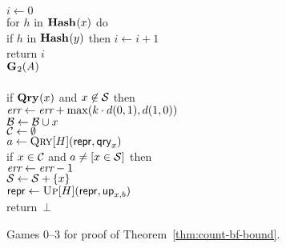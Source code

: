 \begin{figure*}
{      $i \gets 0$\\
      for $h$ in $\textup{\textbf{Hash}}\hspace{0.5pt}(x)$ do\\
      \tab if $h$ in $\textup{\textbf{Hash}}\hspace{0.5pt}(y)$ then $i \gets i+1$\\
      return $i$
    \\[6pt]
    \underline{$\textup{\textbf{G}}\hspace{0.5pt}_2(\mathit{A})$}\\[2pt]
    \\
      if $\textup{\textbf{Qry}}\hspace{0.5pt}(x)$ and $x \not\in \mathcal{S}$ then\\
      \tab $\textit{err} \gets \textit{err} + \max(k \cdot d(0,1), d(1,0))$\\
      $\mathcal{B} \gets \mathcal{B} \cup x$\\
      $\mathcal{C} \gets \emptyset$\\
      $a \gets \textnormal{\textsc{Qry}}[H](\mathsf{repr}, \mathsf{qry}_x)$\\
      if $x \in \mathcal{C}$ and $a \neq [x \in \mathcal{S}]$ then\\
      \tab $\textit{err} \gets \textit{err}-1$\\
      $\mathcal{S} \gets \mathcal{S} + \{x\}$\\
      $\mathsf{repr} \gets \textnormal{\textsc{Up}}[H](\mathsf{repr},\mathsf{up}_{x,b})$\\
      return~$\bot$
  }
  {
  }
  {
  }
  \caption{Games 0--3 for proof of Theorem~\ref{thm:count-bf-bound}.}
  \label{fig:count-bf-bound}
\end{figure*}

